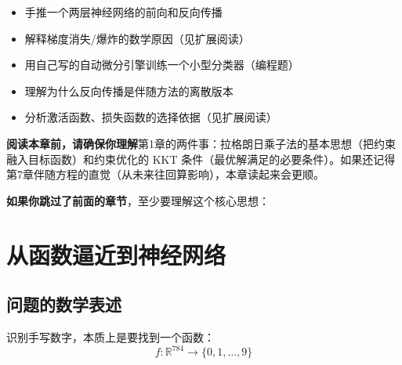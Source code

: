\begin{tcolorbox}[colback=green!5, colframe=green!60!black, title=学完这章，你将能够...]
\begin{itemize}
    \item 手推一个两层神经网络的前向和反向传播
    \item 解释梯度消失/爆炸的数学原因（见扩展阅读）
    \item 用自己写的自动微分引擎训练一个小型分类器（编程题）
    \item 理解为什么反向传播是伴随方法的离散版本
    \item 分析激活函数、损失函数的选择依据（见扩展阅读）
\end{itemize}
\end{tcolorbox}

\begin{insightbox}
\textbf{阅读本章前，请确保你理解}第1章的两件事：拉格朗日乘子法的基本思想（把约束融入目标函数）和约束优化的 KKT 条件（最优解满足的必要条件）。如果还记得第7章伴随方程的直觉（从未来往回算影响），本章读起来会更顺。

\textbf{如果你跳过了前面的章节}，至少要理解这个核心思想：
\begin{center}
\end{center}
\end{insightbox}

\section{从函数逼近到神经网络}

\subsection{问题的数学表述}

识别手写数字，本质上是要找到一个函数：
\begin{equation}
f: \mathbb{R}^{784} \to \{0, 1, \ldots, 9\}
\end{equation}

